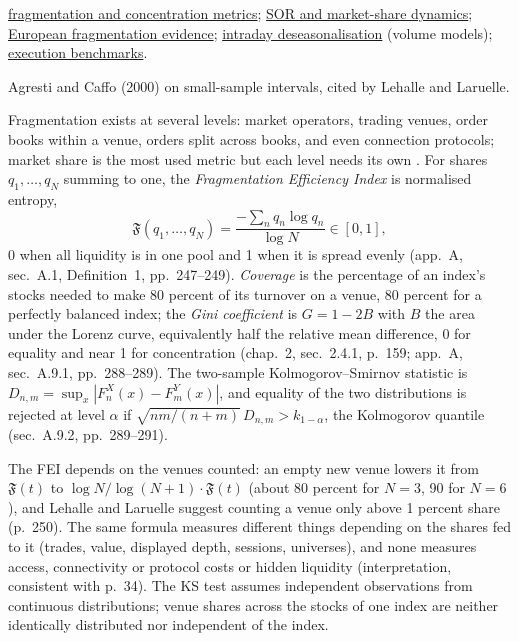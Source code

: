 \begin{qfmethod}
 \hyperref[meth:fragmentation-concentration-metrics]{fragmentation and concentration metrics}; \hyperref[mod:sor-market-share-dynamics]{SOR and market-share dynamics}; \hyperref[ev:european-fragmentation-evidence]{European fragmentation evidence}; \hyperref[meth:intraday-deseasonalisation]{intraday deseasonalisation} (volume models); \hyperref[def:execution-benchmark]{execution benchmarks}.

 Agresti and Caffo (2000) on small-sample intervals, cited by Lehalle and Laruelle.

\end{qfmethod}

\begin{qfmethod}\label{meth:fragmentation-concentration-metrics}
 Fragmentation exists at several levels: market operators, trading venues, order books within a venue, orders split across books, and even connection protocols; market share is the most used metric but each level needs its own \citep[chap.~1, sec.~1.1.1, pp.~33--34]{alpha-laruelle}. For shares $q_1,\dots,q_N$ summing to one, the \emph{Fragmentation Efficiency Index} is normalised entropy,
\[ \mathfrak F(q_1,\dots,q_N)=\frac{-\sum_nq_n\log q_n}{\log N}\in[0,1], \]
0 when all liquidity is in one pool and 1 when it is spread evenly (app.~A, sec.~A.1, Definition~1, pp.~247--249). \emph{Coverage} is the percentage of an index's stocks needed to make 80 percent of its turnover on a venue, 80 percent for a perfectly balanced index; the \emph{Gini coefficient} is $G=1-2B$ with $B$ the area under the Lorenz curve, equivalently half the relative mean difference, 0 for equality and near 1 for concentration (chap.~2, sec.~2.4.1, p.~159; app.~A, sec.~A.9.1, pp.~288--289). The two-sample Kolmogorov--Smirnov statistic is $D_{n,m}=\sup_x|F^X_n(x)-F^Y_m(x)|$, and equality of the two distributions is rejected at level $\alpha$ if $\sqrt{nm/(n+m)}\,D_{n,m}>k_{1-\alpha}$, the Kolmogorov quantile (sec.~A.9.2, pp.~289--291).

 The FEI depends on the venues counted: an empty new venue lowers it from $\mathfrak F(t)$ to $\log N/\log(N+1)\cdot\mathfrak F(t)$ (about 80 percent for $N=3$, 90 for $N=6$), and Lehalle and Laruelle suggest counting a venue only above 1 percent share (p.~250). The same formula measures different things depending on the shares fed to it (trades, value, displayed depth, sessions, universes), and none measures access, connectivity or protocol costs or hidden liquidity (interpretation, consistent with p.~34). The KS test assumes independent observations from continuous distributions; venue shares across the stocks of one index are neither identically distributed nor independent of the index.


\end{qfmethod}
